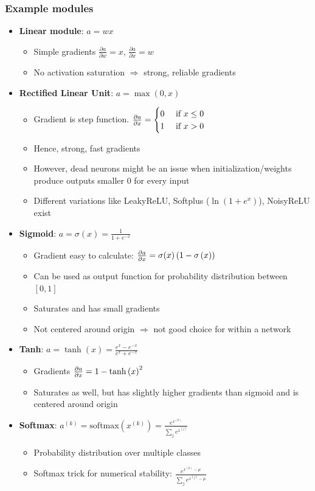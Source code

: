 \subsubsection{Example modules}
\begin{itemize}
	\item \textbf{Linear module}: $a = wx$
	\begin{itemize}
		\item Simple gradients $\frac{\partial a}{\partial w} = x$, $\frac{\partial a}{\partial x} = w$
		\item No activation saturation $\Rightarrow$ strong, reliable gradients
	\end{itemize}
	\item \textbf{Rectified Linear Unit}: $a = \max(0,x)$
	\begin{itemize}
		\item Gradient is step function. $\frac{\partial a}{\partial x} = \begin{cases}
		0 & \text{ if } x\leq 0\\
		1 & \text{ if } x > 0\\
		\end{cases}$
		\item Hence, strong, fast gradients
		\item However, dead neurons might be an issue when initialization/weights produce outputs smaller 0 for every input 
		\item Different variations like LeakyReLU, Softplus ($\ln(1+e^{x})$), NoisyReLU exist
	\end{itemize}
	\item \textbf{Sigmoid}: $a=\sigma(x)=\frac{1}{1+e^{-x}}$
	\begin{itemize}
		\item Gradient easy to calculate: $\frac{\partial a}{\partial x} = \sigma(x)\left(1-\sigma\left(x\right)\right)$
		\item Can be used as output function for probability distribution between $[0,1]$
		\item Saturates and has small gradients
		\item Not centered around origin $\Rightarrow$ not good choice for within a network
	\end{itemize}
	\item \textbf{Tanh}: $a=\tanh\left(x\right)=\frac{e^{x}-e^{-x}}{e^{x}+e^{-x}}$
	\begin{itemize}
		\item Gradients $\frac{\partial a}{\partial x}=1-\tanh\left(x\right)^2$
		\item Saturates as well, but has slightly higher gradients than sigmoid and is centered around origin
	\end{itemize}
	\item \textbf{Softmax}: $a^{(k)} = \text{softmax}\left(x^{(k)}\right) = \frac{e^{x^{(k)}}}{\sum_j e^{x^{(j)}}}$
	\begin{itemize}
		\item Probability distribution over multiple classes
		\item Softmax trick for numerical stability: $\frac{e^{x^{(k)}-\mu}}{\sum_j e^{x^{(j)}-\mu}}$
	\end{itemize}
\end{itemize}
